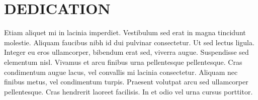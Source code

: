 \chapter*{DEDICATION}

Etiam aliquet mi in lacinia imperdiet. Vestibulum sed erat in magna tincidunt molestie. Aliquam faucibus nibh id dui pulvinar consectetur. Ut sed lectus ligula. Integer eu eros ullamcorper, bibendum erat sed, viverra augue. Suspendisse sed elementum nisl. Vivamus et arcu finibus urna pellentesque pellentesque. Cras condimentum augue lacus, vel convallis mi lacinia consectetur. Aliquam nec finibus metus, vel condimentum turpis. Praesent volutpat arcu sed ullamcorper pellentesque. Cras hendrerit laoreet facilisis. In et odio vel urna cursus porttitor.
